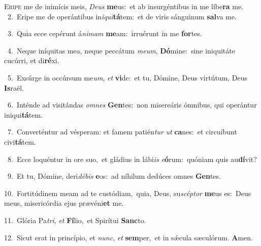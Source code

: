 \lettrine{\initial\textcolor{\initialcolor}{E}}{ripe} me de inimícis meis, \textit{De}\-\textit{us} \textbf{me}\-us:~\star et ab insurgéntibus in me líbe\textbf{ra} me.\\
{\numbfont\textcolor{\numbcolor}{~2.}}~Eripe me de operántibus in\-\textit{i}\-\textit{qui}\textbf{tá}tem:~\star et de viris sánguinum \textbf{sal}\-va me.\par
{\numbfont\textcolor{\numbcolor}{~3.}}~Quia ecce cepérunt á\-\textit{ni}\-\textit{mam} \textbf{me}\-am:~\star irruérunt in me \textbf{for}\-tes.\par
{\numbfont\textcolor{\numbcolor}{~4.}}~Neque iníquitas mea, neque peccátum \textit{me}\-\textit{um}, \textbf{Dó}\-mine:~\star sine iniquitáte cucúrri, et di\-\textbf{ré}\-xi.\par
{\numbfont\textcolor{\numbcolor}{~5.}}~Exsúrge in occúrsum me\-\textit{um}\-, \textit{et} \textbf{vi}\-de:~\star et tu, Dómine, Deus virtútum, Deus \textbf{Is}\-raël.\par
{\numbfont\textcolor{\numbcolor}{~6.}}~Inténde ad visitándas \textit{om}\-\textit{nes} \textbf{Gen}\-tes:~\star non misereáris ómnibus, qui operántur iniqui\-\textbf{tá}\-tem.\par
{\numbfont\textcolor{\numbcolor}{~7.}}~Converténtur ad vésperam: et famem patién\textit{tur} \textit{ut} \textbf{ca}\-nes:~\star et circuíbunt civi\-\textbf{tá}\-tem.\par
{\numbfont\textcolor{\numbcolor}{~8.}}~Ecce loquéntur in ore suo,~\dagger et gládius in lábi\textit{is} \textit{e}\-\textbf{ó}rum:~\star quóniam quis au\-\textbf{dí}\-vit?\par
{\numbfont\textcolor{\numbcolor}{~9.}}~Et tu, Dómine, deri\-\textit{dé}\-\textit{bis} \textbf{e}\-os:~\star ad níhilum dedúces omnes \textbf{Gen}\-tes.\par
{\numbfont\textcolor{\numbcolor}{10.}}~Fortitúdinem meam ad te custódiam,~\dagger quia, Deus, su\-\textit{scép}\-\textit{tor} \textbf{me}\-us es:~\star Deus meus, misericórdia ejus prævéni\textbf{et} me.\par
{\numbfont\textcolor{\numbcolor}{11.}}~Glória Pa\-\textit{tri}\-, \textit{et} \textbf{Fí}\-lio,~\star et Spirítui \textbf{Sanc}\-to.\par
{\numbfont\textcolor{\numbcolor}{12.}}~Sicut erat in princípio, et \textit{nunc}\-, \textit{et} \textbf{sem}\-per,~\star et in sǽcula sæculórum. \textbf{A}\-men.\par
